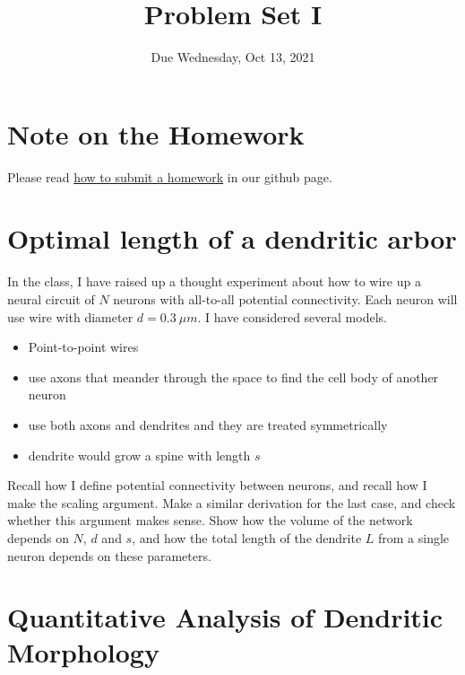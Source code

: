 \documentclass{article}
\title{Problem Set I}
\date{Due Wednesday, Oct  13, 2021}
\begin{document}
\maketitle

\section*{Note on the Homework}

Please read \href{https://github.com/Wenlab/Computation-Neuro-Course/wiki/%E4%BD%9C%E4%B8%9A%E6%8F%90%E4%BA%A4}{how to submit a homework} in our github page.

\section*{Optimal length of a dendritic arbor}
In the class, I have raised up a thought experiment about how to wire up a neural circuit of $N$ neurons with all-to-all potential connectivity. Each neuron will use wire with diameter $d = 0.3\ \mu m$. I have considered several models.
\begin{itemize}
\item {Point-to-point wires} 
\item {use axons that meander through the space to find the cell body of another neuron}
\item {use both axons and dendrites and they are treated symmetrically}
\item {dendrite would grow a spine with length $s$}
\end{itemize} 
Recall how I define potential connectivity between neurons, and recall how I make the scaling argument. Make a similar derivation for the last case, and check whether this argument makes sense. Show how the volume of the network depends on $N$, $d$ and $s$,
and how the total length of the dendrite $L$ from a single neuron depends on these parameters. 


\section*{Quantitative Analysis of Dendritic Morphology}
\end{document}
